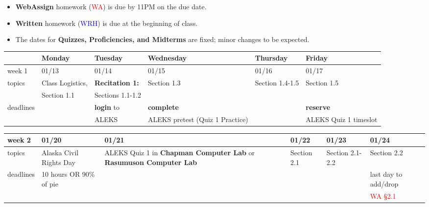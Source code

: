 \documentclass[11pt]{article}
\begin{document}
\thispagestyle{fancy}


\begin{itemize}
\item \textbf{WebAssign} homework (\textcolor{red}{WA}) is due by 11PM on the due date. 
\item \textbf{Written} homework (\textcolor{blue}{WRH}) is due at the beginning of  class.
\item The dates for \textbf{Quizzes, Proficiencies, and Midterms} are fixed; minor changes to be expected.\end{itemize}
\begin{center}
\begin{tabularx}{\textwidth}{|p{1.5cm}|| L | L | L | L | L |}
\hline
&Monday & Tuesday & Wednesday & Thursday & Friday \\
\hline \hline
week 1&01/13&01/14&01/15&01/16&01/17\\
\hline
topics &Class Logistics, & \textbf{Recitation 1:} & Section 1.3&  Section 1.4-1.5& Section 1.5\\
& Section 1.1 & Sections 1.1-1.2&&&\\
\hline
deadlines&&\textbf{login} to &\textbf{complete}&&\textbf{reserve}\\
&&ALEKS&ALEKS pretest (Quiz 1 Practice)&&ALEKS Quiz 1 timeslot\\
\hline 
\end{tabularx}
\end{center}

\begin{center}
\begin{tabularx}{\textwidth}{|p{1.5cm}|| L | L | L | L | L |}
\hline
week 2&01/20&01/21&01/22&01/23&01/24\\ \hline
topics&Alaska Civil Rights Day&ALEKS Quiz 1 in \textbf{Chapman Computer Lab} or \textbf{Rasumuson Computer Lab} & Section 2.1 &Section 2.1-2.2&Section 2.2\\ 
\hline
deadlines&10 hours OR 90\% of pie&&&&\textcolor{ddgreen}{last day to add/drop}\\ 
&&&&&\textcolor{red}{WA \S 2.1} \\
 \hline \end{tabularx} \end{center}
\end{document}
